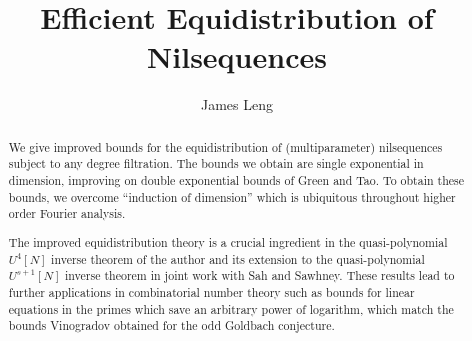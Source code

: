 \documentclass[11pt, a4paper]{amsart}
\theoremstyle{plain}
\theoremstyle{plain}
\theoremstyle{definition}
\theoremstyle{remark}
\numberwithin{equation}{section}
\numberwithin{lemma}{section}
\numberwithin{proposition}{section}
\numberwithin{corollary}{section}
\numberwithin{definition}{section}
\numberwithin{claim}{section}
\begin{document}
\title[Efficient Equidistribution of Nilsequences]{Efficient Equidistribution of Nilsequences}
\author{James Leng}
\address[James Leng]{Department of Mathematics\\
     UCLA \\ Los Angeles, CA 90095, USA.}



\maketitle

\begin{abstract}
We give improved bounds for the equidistribution of (multiparameter) nilsequences subject to any degree filtration. The bounds we obtain are single exponential in dimension, improving on double exponential bounds of Green and Tao. To obtain these bounds, we overcome ``induction of dimension'' which is ubiquitous throughout higher order Fourier analysis.

The improved equidistribution theory is a crucial ingredient in the quasi-polynomial $U^4[N]$ inverse theorem of the author and its extension to the quasi-polynomial $U^{s + 1}[N]$ inverse theorem in joint work with Sah and Sawhney. These results lead to further applications in combinatorial number theory such as bounds for linear equations in the primes which save an arbitrary power of logarithm, which match the bounds Vinogradov obtained for the odd Goldbach conjecture.
\end{abstract}
\end{document}
